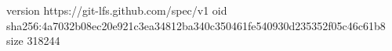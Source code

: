 version https://git-lfs.github.com/spec/v1
oid sha256:4a7032b08ec20e921c3ea34812ba340c350461fe540930d235352f05c46c61b8
size 318244
